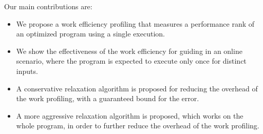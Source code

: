     Our main contributions are:

    \begin{itemize}[leftmargin=3mm]

        \item We propose a work efficiency profiling that measures a performance rank of an optimized program using a single execution.

        \item We show the effectiveness of the work efficiency for guiding {\itercomp} in an online scenario, where the program is expected
        to execute only once for distinct inputs.

        \item A conservative relaxation algorithm is proposed for reducing the overhead of the work profiling, with a guaranteed bound for
        the error.

        \item A more aggressive relaxation algorithm is proposed, which works on the whole program, in order to further reduce the overhead
        of the work profiling.

    \end{itemize}
